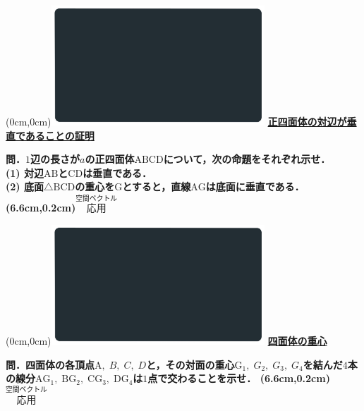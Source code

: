 \documentclass[10pt,
fleqn,
dvipdfmx,
uplatex
]{jsarticle}
\begin{document}
\newpage



\at(0cm,0cm){\includegraphics[width=8cm,bb=0 0 1920 1080]{./youtube/thumbnails/templates/smart_background/空間ベクトル.jpeg}}
{\color{orange}\bf\boldmath\normalsize\underline{正四面体の対辺が垂直であることの証明}}\vspace{0.3zw}

\large 
\bf\boldmath 問．$1$辺の長さが$a$の正四面体$\text{ABCD}$について，次の命題をそれぞれ示せ．\\
(1)  対辺$\text{AB}$と$\text{CD}$は垂直である．\\
(2)  底面$\triangle \text{BCD}$の重心を$\text{G}$とすると，直線$\text{AG}$は底面に垂直である．\\

\at(6.6cm,0.2cm){\small\color{bradorange}$\overset{\text{空間ベクトル}}{\text{応用}}$}


\newpage



\at(0cm,0cm){\includegraphics[width=8cm,bb=0 0 1920 1080]{./youtube/thumbnails/templates/smart_background/空間ベクトル.jpeg}}
{\color{orange}\bf\boldmath\huge\underline{四面体の重心}}\vspace{0.3zw}

\Large 
\bf\boldmath 問．四面体の各頂点$\text{A},\;B,\;C,\;D$と，その対面の重心$\text{G}_1,\;G_2,\;G_3,\;G_4$を結んだ$4$本の線分$\text{AG}_1,\;\text{BG}_2,\;\text{CG}_3,\;\text{DG}_4$は$1$点で交わることを示せ．
\at(6.6cm,0.2cm){\small\color{bradorange}$\overset{\text{空間ベクトル}}{\text{応用}}$}


\newpage
\end{document}
